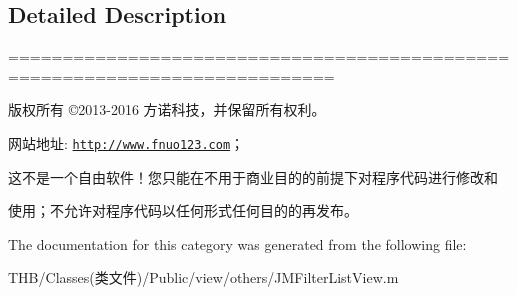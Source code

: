 \subsection{Detailed Description}
============================================================================

版权所有 ©2013-\/2016 方诺科技，并保留所有权利。

网站地址\+: \href{http://www.fnuo123.com}{\tt http\+://www.\+fnuo123.\+com}； 



这不是一个自由软件！您只能在不用于商业目的的前提下对程序代码进行修改和

使用；不允许对程序代码以任何形式任何目的的再发布。 

 

The documentation for this category was generated from the following file\+:\begin{DoxyCompactItemize}
\item 
T\+H\+B/\+Classes(类文件)/\+Public/view/others/J\+M\+Filter\+List\+View.\+m\end{DoxyCompactItemize}
